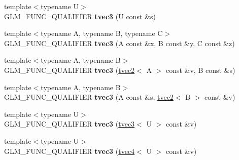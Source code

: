\begin{DoxyCompactItemize}
\item 
\hypertarget{structglm_1_1detail_1_1tvec3_ab799aaa532aeb274dc35202fadee022e}{}{\footnotesize template$<$typename U$>$ }\\G\+L\+M\+\_\+\+F\+U\+N\+C\+\_\+\+Q\+U\+A\+L\+I\+F\+I\+E\+R {\bfseries tvec3} (U const \&s)\label{structglm_1_1detail_1_1tvec3_ab799aaa532aeb274dc35202fadee022e}

\item 
\hypertarget{structglm_1_1detail_1_1tvec3_a58cebfa4b0aa77d2923392ec2ffa5914}{}{\footnotesize template$<$typename A, typename B, typename C$>$ }\\G\+L\+M\+\_\+\+F\+U\+N\+C\+\_\+\+Q\+U\+A\+L\+I\+F\+I\+E\+R {\bfseries tvec3} (A const \&x, B const \&y, C const \&z)\label{structglm_1_1detail_1_1tvec3_a58cebfa4b0aa77d2923392ec2ffa5914}

\item 
\hypertarget{structglm_1_1detail_1_1tvec3_a93e0eda59eb310d83f8f73622689c9e8}{}{\footnotesize template$<$typename A, typename B$>$ }\\G\+L\+M\+\_\+\+F\+U\+N\+C\+\_\+\+Q\+U\+A\+L\+I\+F\+I\+E\+R {\bfseries tvec3} (\hyperlink{structglm_1_1detail_1_1tvec2}{tvec2}$<$ A $>$ const \&v, B const \&s)\label{structglm_1_1detail_1_1tvec3_a93e0eda59eb310d83f8f73622689c9e8}

\item 
\hypertarget{structglm_1_1detail_1_1tvec3_a21b10c8625726235dbdcfdcf27a0bcf2}{}{\footnotesize template$<$typename A, typename B$>$ }\\G\+L\+M\+\_\+\+F\+U\+N\+C\+\_\+\+Q\+U\+A\+L\+I\+F\+I\+E\+R {\bfseries tvec3} (A const \&s, \hyperlink{structglm_1_1detail_1_1tvec2}{tvec2}$<$ B $>$ const \&v)\label{structglm_1_1detail_1_1tvec3_a21b10c8625726235dbdcfdcf27a0bcf2}

\item 
\hypertarget{structglm_1_1detail_1_1tvec3_a7f0a51d91dfe21ce2b6f1b19406e8fea}{}{\footnotesize template$<$typename U$>$ }\\G\+L\+M\+\_\+\+F\+U\+N\+C\+\_\+\+Q\+U\+A\+L\+I\+F\+I\+E\+R {\bfseries tvec3} (\hyperlink{structglm_1_1detail_1_1tvec3}{tvec3}$<$ U $>$ const \&v)\label{structglm_1_1detail_1_1tvec3_a7f0a51d91dfe21ce2b6f1b19406e8fea}

\item 
\hypertarget{structglm_1_1detail_1_1tvec3_af1161d51dbbff4908afac43042b9a746}{}{\footnotesize template$<$typename U$>$ }\\G\+L\+M\+\_\+\+F\+U\+N\+C\+\_\+\+Q\+U\+A\+L\+I\+F\+I\+E\+R {\bfseries tvec3} (\hyperlink{structglm_1_1detail_1_1tvec4}{tvec4}$<$ U $>$ const \&v)\label{structglm_1_1detail_1_1tvec3_af1161d51dbbff4908afac43042b9a746}


\end{DoxyCompactItemize}

